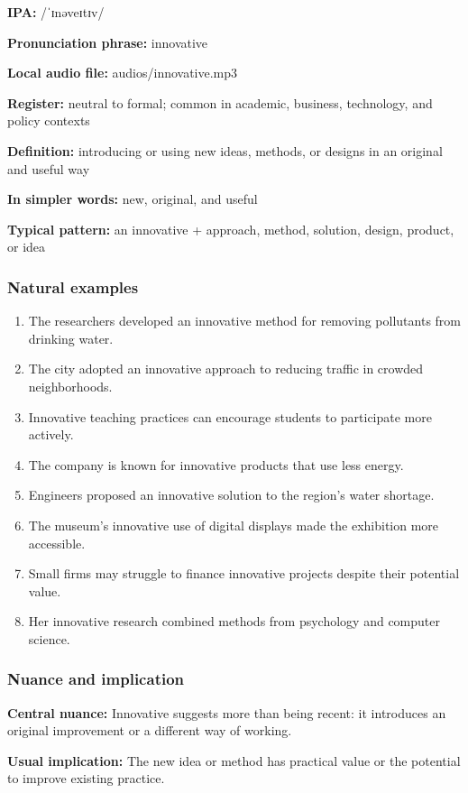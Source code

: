 \documentclass[11pt]{article}
\begin{document}
\textbf{IPA:} /ˈɪnəveɪtɪv/

\textbf{Pronunciation phrase:} innovative

\textbf{Local audio file:} audios/innovative.mp3

\textbf{Register:} neutral to formal; common in academic, business, technology, and policy contexts

\textbf{Definition:} introducing or using new ideas, methods, or designs in an original and useful way

\textbf{In simpler words:} new, original, and useful

\textbf{Typical pattern:} an innovative + approach, method, solution, design, product, or idea

\subsubsection{Natural examples}
\begin{enumerate}
  \item The researchers developed an innovative method for removing pollutants from drinking water.
  \item The city adopted an innovative approach to reducing traffic in crowded neighborhoods.
  \item Innovative teaching practices can encourage students to participate more actively.
  \item The company is known for innovative products that use less energy.
  \item Engineers proposed an innovative solution to the region's water shortage.
  \item The museum's innovative use of digital displays made the exhibition more accessible.
  \item Small firms may struggle to finance innovative projects despite their potential value.
  \item Her innovative research combined methods from psychology and computer science.
\end{enumerate}

\subsubsection{Nuance and implication}
\textbf{Central nuance:} Innovative suggests more than being recent: it introduces an original improvement or a different way of working.

\textbf{Usual implication:} The new idea or method has practical value or the potential to improve existing practice.
\end{document}
